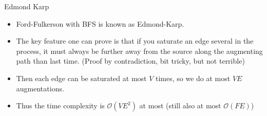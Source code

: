 \documentclass{beamer}
\begin{document}
	\begin{frame}[plain]{Edmond Karp}
		\begin{itemize}
			\item Ford-Fulkerson with BFS is known as Edmond-Karp.
			\item The key feature one can prove is that if you saturate an edge several in the process, it must always be further away from the source along the augmenting path than last time. (Proof by contradiction, bit tricky, but not terrible)
			\item Then each edge can be saturated at most $V$ times, so we do at most $VE$ augmentations.
			\item Thus the time complexity is $\mathcal{O}(VE^2)$ at most (still also at most $\mathcal{O}(FE)$)
		\end{itemize}
	\end{frame}
	
\end{document}
